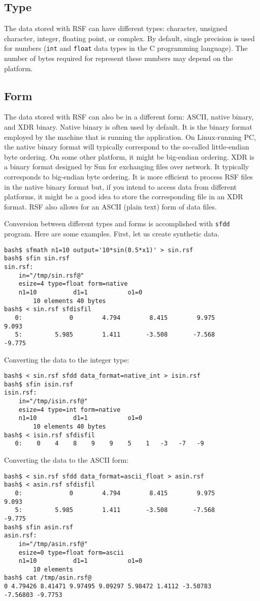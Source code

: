 \subsection{Type}

The data stored with RSF can have different types: character, unsigned
character, integer, floating point, or complex. By default, single precision
is used for numbers (\texttt{int} and \texttt{float} data types in the C
programming language). The number of bytes required for represent these
numbers may depend on the platform.

\subsection{Form}

The data stored with RSF can also be in a different form: ASCII, native
binary, and XDR binary. Native binary is often used by default. It is the
binary format employed by the machine that is running the application. On
Linux-running PC, the native binary format will typically correspond to the
so-called little-endian byte ordering. On some other platform, it might be
big-endian ordering. XDR is a binary format designed by Sun for exchanging
files over network. It typically corresponds to big-endian byte ordering. It
is more efficient to process RSF files in the native binary format but, if you
intend to access data from different platforms, it might be a good idea to
store the corresponding file in an XDR format. RSF also allows for an ASCII
(plain text) form of data files. 

Conversion between different types and forms is accomplished with
\texttt{sfdd} program. Here are some examples. First, let us create synthetic
data.
\begin{verbatim}
bash$ sfmath n1=10 output='10*sin(0.5*x1)' > sin.rsf
bash$ sfin sin.rsf
sin.rsf:
    in="/tmp/sin.rsf@"
    esize=4 type=float form=native
    n1=10          d1=1           o1=0
        10 elements 40 bytes
bash$ < sin.rsf sfdisfil
   0:             0        4.794        8.415        9.975        9.093
   5:         5.985        1.411       -3.508       -7.568       -9.775
\end{verbatim}
Converting the data to the integer type:
\begin{verbatim}
bash$ < sin.rsf sfdd data_format=native_int > isin.rsf
bash$ sfin isin.rsf
isin.rsf:
    in="/tmp/isin.rsf@"
    esize=4 type=int form=native
    n1=10          d1=1           o1=0
        10 elements 40 bytes
bash$ < isin.rsf sfdisfil
   0:    0    4    8    9    9    5    1   -3   -7   -9
\end{verbatim}
Converting the data to the ASCII form:
\begin{verbatim}
bash$ < sin.rsf sfdd data_format=ascii_float > asin.rsf
bash$ < asin.rsf sfdisfil
   0:             0        4.794        8.415        9.975        9.093
   5:         5.985        1.411       -3.508       -7.568       -9.775
bash$ sfin asin.rsf
asin.rsf:
    in="/tmp/asin.rsf@"
    esize=0 type=float form=ascii
    n1=10          d1=1           o1=0
        10 elements
bash$ cat /tmp/asin.rsf@
0 4.79426 8.41471 9.97495 9.09297 5.98472 1.4112 -3.50783
-7.56803 -9.7753
\end{verbatim}

